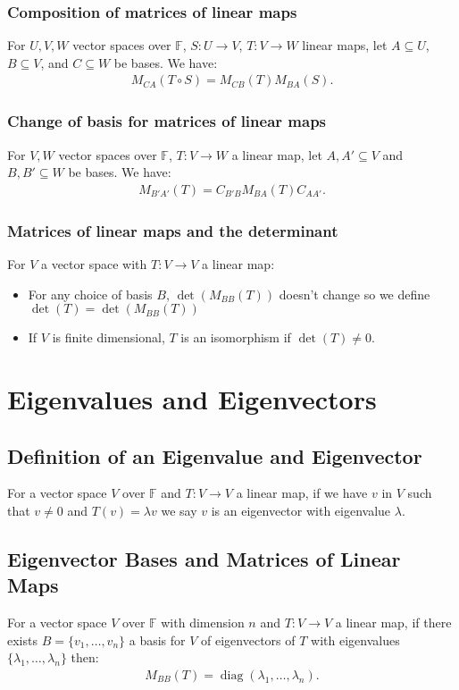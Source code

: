 \documentclass[a4paper, 12pt, twoside]{article}
\DeclareMathOperator{\Diag}{diag}
\begin{document}
\newpage

\subsubsection{Composition of matrices of linear maps}

For $U, V, W$ vector spaces over $\mathbb{F}$, $S : U \to V$, 
$T : V \to W$ linear maps, let $A \subseteq U$, $B \subseteq V$,
and $C \subseteq W$ be bases. We have:
\begin{align*}
  M_{CA}(T \circ S) = M_{CB}(T)M_{BA}(S).
\end{align*}

\subsubsection{Change of basis for matrices of linear maps}

For $V, W$ vector spaces over $\mathbb{F}$, $T : V \to W$ a linear 
map, let $A, A' \subseteq V$ and $B, B' \subseteq W$ be bases. 
We have:
\begin{align*}
  M_{B'A'}(T) = C_{B'B}M_{BA}(T)C_{AA'}.
\end{align*}

\subsubsection{Matrices of linear maps and the determinant}

For $V$ a vector space with $T : V \to V$ a linear map:
\begin{itemize}
  \item For any choice of basis $B$, $\det(M_{BB}(T))$ doesn't change
  so we define $\det(T) = \det(M_{BB}(T))$
  \item If $V$ is finite dimensional, $T$ is an isomorphism if
  $\det(T) \neq 0$.
\end{itemize}

\section{Eigenvalues and Eigenvectors}

\subsection{Definition of an Eigenvalue and Eigenvector}

For a vector space $V$ over $\mathbb{F}$ and $T : V \to V$ a linear
map, if we have $v$ in $V$ such that $v \neq 0$ and $T(v) = \lambda v$
we say $v$ is an eigenvector with eigenvalue $\lambda$.

\subsection{Eigenvector Bases and Matrices of Linear Maps}

For a vector space $V$ over $\mathbb{F}$ with dimension $n$ and 
$T : V \to V$ a linear map, if there exists 
$B = \{v_1, \ldots, v_n\}$ a basis for $V$ of eigenvectors of $T$
with eigenvalues $\{\lambda_1, \ldots, \lambda_n\}$ then:
\begin{align*}
  M_{BB}(T) = \Diag(\lambda_1, \ldots, \lambda_n).
\end{align*}
\end{document}
